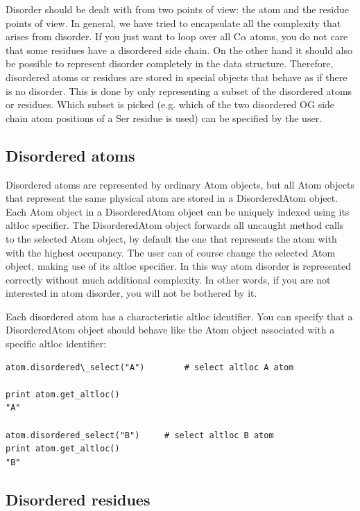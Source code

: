 \documentclass{report}
\begin{document}
Disorder should be dealt with from two points of view: the atom and the residue
points of view. In general, we have tried to encapsulate all the complexity that
arises from disorder. If you just want to loop over all C\( \alpha  \) atoms,
you do not care that some residues have a disordered side chain. On the other
hand it should also be possible to represent disorder completely in the data
structure. Therefore, disordered atoms or residues are stored in special objects
that behave as if there is no disorder. This is done by only representing a
subset of the disordered atoms or residues. Which subset is picked (e.g. which
of the two disordered OG side chain atom positions of a Ser residue is used)
can be specified by the user.

\subsection{Disordered atoms\label{disordered atoms}}

Disordered atoms are represented by ordinary Atom objects, but all Atom objects
that represent the same physical atom are stored in a DisorderedAtom object.
Each Atom object in a DisorderedAtom object can be uniquely indexed using its
altloc specifier. The DisorderedAtom object forwards all uncaught method calls
to the selected Atom object, by default the one that represents the atom with
with the highest occupancy. The user can of course change the selected Atom
object, making use of its altloc specifier. In this way atom disorder is represented
correctly without much additional complexity. In other words, if you are not
interested in atom disorder, you will not be bothered by it.

Each disordered atom has a characteristic altloc identifier. You can specify
that a DisorderedAtom object should behave like the Atom object associated with
a specific altloc identifier:

\begin{verbatim}
atom.disordered\_select("A")		# select altloc A atom

print atom.get_altloc()
"A"

atom.disordered_select("B")	   	# select altloc B atom
print atom.get_altloc()
"B"
\end{verbatim}

\subsection{Disordered residues}
\end{document}
